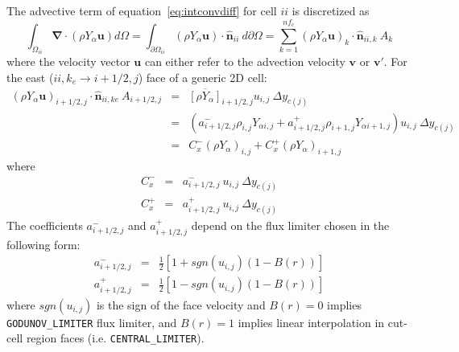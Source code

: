 \documentclass[12pt]{article}
\begin{document}
The advective term of equation~\eqref{eq:intconvdiff} for cell $ii$ is discretized as
%
\begin{equation}
  \int_{\Omega_{ii}} { \boldsymbol{\nabla} \cdot  \left(  \rho Y_\alpha \mathbf{u} \right) } d \Omega =
  \int_{\partial \Omega_{ii}} { \left( \rho Y_\alpha \mathbf{u} \right) \cdot \hat{\mathbf{n}}_{ii} } \: d \partial \Omega =
  \sum^{nf_c}_{k=1} \left( \rho Y_\alpha \mathbf{u} \right)_k \cdot \hat{\mathbf{n}}_{ii,k} \: A_k \label{eq:fvadv}
\end{equation}
%
where the velocity vector $\mathbf{u}$ can either refer to the advection velocity $\mathbf{v}$ or $\mathbf{v}'$. For the east ($ii,k_e \rightarrow i+1/2,j$)  face of a generic 2D cell:
%
\begin{eqnarray}
  \left( \rho Y_\alpha \mathbf{u} \right)_{i+1/2,j} \cdot \hat{\mathbf{n}}_{ii,ke} \: A_{i+1/2,j} & = &
  \overline{\left[ \rho Y_\alpha \right]}_{i+1/2,j} u_{i,j} \: \Delta y_{c(j)} \nonumber \\
  & = & \left(a^-_{i+1/2,j} \rho_{i,j} Y_{\alpha i,j} + a^+_{i+1/2,j} \rho_{i+1,j} Y_{\alpha i+1,j} \right) u_{i,j} \: \Delta y_{c(j)} \nonumber \\
  & = & C^-_x  \left( \rho Y_{\alpha} \right)_{i,j}  +  C^+_x  \left( \rho Y_{\alpha} \right)_{i+1,j} \label{eq:advfvcx}
\end{eqnarray}
%
where
%
\begin{eqnarray}
   C^-_x & = &  a^-_{i+1/2,j} \: u_{i,j}  \: \Delta y_{c(j)} \\
   C^+_x & = &  a^+_{i+1/2,j} \: u_{i,j} \:  \Delta y_{c(j)}
\end{eqnarray}
%
The coefficients $a^-_{i+1/2,j}$ and $a^+_{i+1/2,j}$ depend on the flux limiter chosen in the following form:
%
\begin{eqnarray}
   a^-_{i+1/2,j}  & = & \frac{1}{2} \left[ 1 + sgn(u_{i,j}) \left(1-B(r) \right) \right] \\
   a^+_{i+1/2,j} & = & \frac{1}{2} \left[ 1 - sgn(u_{i,j}) \left(1-B(r) \right) \right]
\end{eqnarray}
%
where $sgn(u_{i,j})$ is the sign of the face velocity and $B(r)=0$ implies \texttt{GODUNOV\_LIMITER} flux limiter, and $B(r)=1$ implies linear interpolation in cut-cell region faces (i.e. \texttt{CENTRAL\_LIMITER}).
\end{document}
